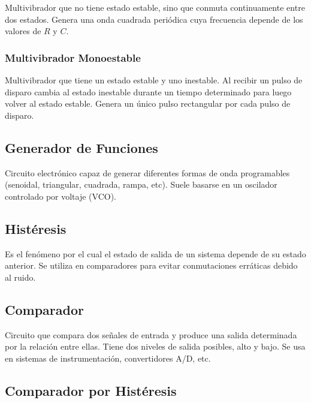                 Multivibrador que no tiene estado estable, sino que conmuta continuamente entre
                dos estados. Genera una onda cuadrada periódica cuya frecuencia depende de los valores
                de \(R\) y \(C\).
                
                \subsubsection*{Multivibrador Monoestable}
                
                Multivibrador que tiene un estado estable y uno inestable. Al recibir un pulso de
                disparo cambia al estado inestable durante un tiempo determinado para luego volver al
                estado estable. Genera un único pulso rectangular por cada pulso de disparo.

            \subsection*{Generador de Funciones}

                Circuito electrónico capaz de generar diferentes formas de onda programables
                (senoidal, triangular, cuadrada, rampa, etc). Suele basarse en un oscilador controlado por
                voltaje (VCO).
                
                \subsection*{Histéresis}
                
                Es el fenómeno por el cual el estado de salida de un sistema depende de su estado
                anterior. Se utiliza en comparadores para evitar conmutaciones erráticas debido al ruido.
                
                \subsection*{Comparador}
                
                Circuito que compara dos señales de entrada y produce una salida determinada
                por la relación entre ellas. Tiene dos niveles de salida posibles, alto y bajo. Se usa en
                sistemas de instrumentación, convertidores A/D, etc.
                
                \subsection*{Comparador por Histéresis}
                
